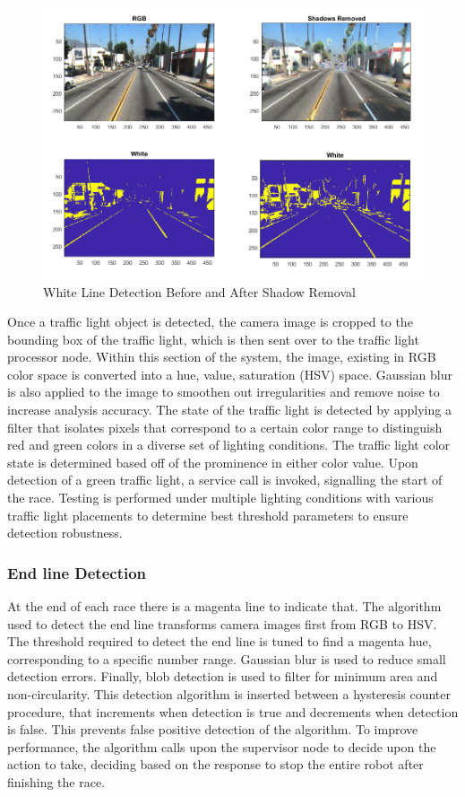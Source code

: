 \documentclass[11pt,journal]{IEEEtran}
\begin{document}
\begin{figure}[ht]
\centerline{\includegraphics[width=0.9\columnwidth]{X6.png}}
\caption{White Line Detection Before and After Shadow Removal}
\label{TrafficLight}
\end{figure}

Once a traffic light object is detected, the camera image is cropped to the bounding box of the traffic light, which is then sent over to the traffic light processor node. Within this section of the system, the image, existing in RGB color space is converted into a hue, value, saturation (HSV) space. Gaussian blur is also applied to the image to smoothen out irregularities and remove noise to increase analysis accuracy. The state of the traffic light is detected by applying a filter that isolates pixels that correspond to a certain color range to distinguish red and green colors in a diverse set of lighting conditions. The traffic light color state is determined based off of the prominence in either color value. Upon detection of a green traffic light, a service call is invoked, signalling the start of the race. Testing is performed under multiple lighting conditions with various traffic light placements to determine best threshold parameters to ensure detection robustness.


\subsubsection{End line Detection}
At the end of each race there is a magenta line to indicate that. The algorithm used to detect the end line transforms camera images first from RGB to HSV. The threshold required to detect the end line is tuned to find a magenta hue, corresponding to a specific number range. Gaussian blur is used to reduce small detection errors. Finally, blob detection is used to filter for minimum area and non-circularity. This detection algorithm is inserted between a hysteresis counter procedure, that increments when detection is true and decrements when detection is false. This prevents false positive detection of the algorithm. To improve performance, the algorithm calls upon the supervisor node to decide upon the action to take, deciding based on the response to stop the entire robot after finishing the race.
\end{document}
